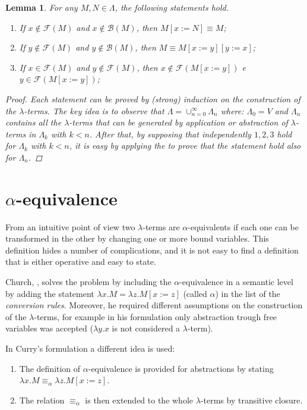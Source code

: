\documentclass[a4paper,11pt]{article}
\newtheorem{lemma}{Lemma}
\theoremstyle{definition}
\newcommand{\FF}{\mathcal{F}}
\newcommand{\BB}{\mathcal{B}}
\begin{document}
\begin{lemma}
  For any $M,N\in\Lambda$, the following statements hold.
  \begin{enumerate}
    \item If $x\not\in\FF(M)$ and $x\not\in\BB(M)$, then $M[x:=N]\equiv M$;
    \item If $y\not\in\FF(M)$ and $y\not\in\BB(M)$, then $M\equiv M[x:=y][y:=x]$;
    \item If $x\in\FF(M)$ and $y\not\in\FF(M)$, then $x\not\in\FF(M[x:=y])$ e
      $y\in\FF(M[x:=y])$;
  \end{enumerate}
  \label{lem:sost}
  \begin{proof}
    Each statement can be proved by (strong) induction on the construction of the
    $\lambda$-terms. The key idea is to observe that $\Lambda =
    \cup_{n=0}^\infty\Lambda_n$ where: $\Lambda_0=V$ and $\Lambda_n$ contains all the
    $\lambda$-terms that can be generated by application or abstraction of $\lambda$-terms 
    in $\Lambda_k$ with $k<n$. After that, by supposing that independently $1,2,3$ hold
    for $\Lambda_k$ with $k<n$, it is easy by applying the 
    to prove that the statement hold also for $\Lambda_n$.
  \end{proof}
\end{lemma}

\section{$\alpha$-equivalence}
\label{sec:alpha-eq}
From an intuitive point of view two $\lambda$-terms are $\alpha$-equivalents
if each one can be transformed in the other by changing one or more bound
variables. This definition hides a number of complications, and it is not
easy to find a definition that is either operative and easy to state. 

Church, \cite{Church}, solves the problem by including the $\alpha$-equivalence in a semantic
level by adding the statement $\lambda x.M = \lambda z.M[x:=z]$ (called
$\alpha$) in the list of the \textit{conversion rules}. Moreover, 
he required different assumptions on the construction of the
$\lambda$-terms, for example in his formulation only abstraction trough free
variables was accepted ($\lambda y.x$ is not considered a $\lambda$-term).

In Curry's formulation \cite{Curry} a different idea is used: 
\begin{enumerate}
  \item The definition of $\alpha$-equivalence is provided for abstractions
    by stating $\lambda x.M \equiv_\alpha \lambda z.M[x:=z]$. 
  \item The relation $\equiv_\alpha$ is then extended to the whole
$\lambda$-terms by transitive closure. 
\end{enumerate}
\end{document}
